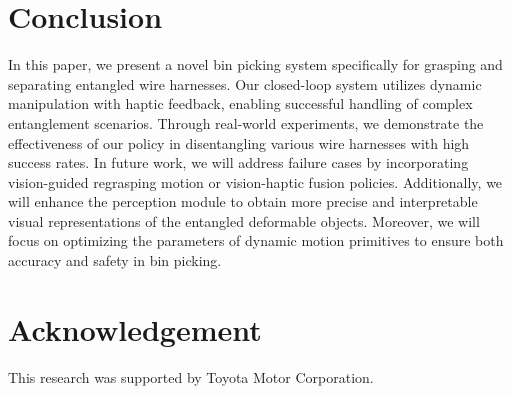 \documentclass[letterpaper, 10 pt, conference]{ieeeconf}
\begin{document}



\section{Conclusion}\label{sec:con}
    
    In this paper, we present a novel bin picking system specifically for grasping and separating entangled wire harnesses. Our closed-loop system utilizes dynamic manipulation with haptic feedback, enabling successful handling of complex entanglement scenarios. Through real-world experiments, we demonstrate the effectiveness of our policy in disentangling various wire harnesses with high success rates. In future work, we will address failure cases by incorporating vision-guided regrasping motion or vision-haptic fusion policies. Additionally, we will enhance the perception module to obtain more precise and interpretable visual representations of the entangled deformable objects. Moreover, we will focus on optimizing the parameters of dynamic motion primitives to ensure both accuracy and safety in bin picking.

\section*{Acknowledgement}
    This research was supported by Toyota Motor Corporation.    
    


\end{document}
